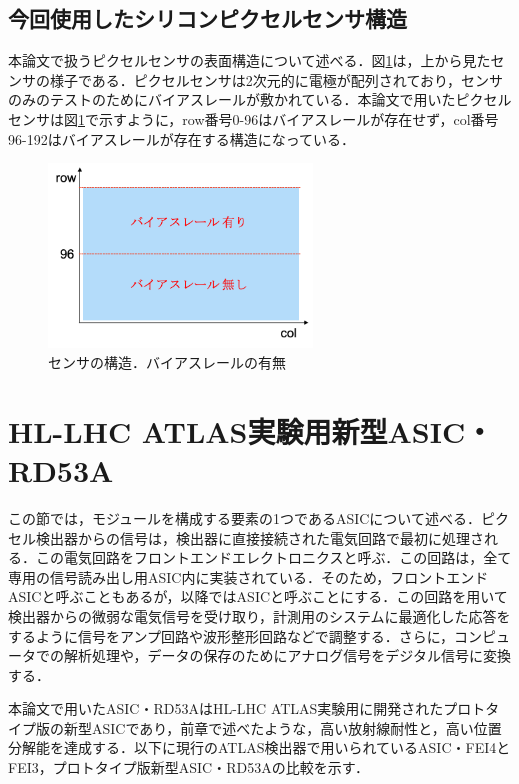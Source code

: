 \subsection{今回使用したシリコンピクセルセンサ構造}
本論文で扱うピクセルセンサの表面構造について述べる．図\ref{fig:sensor}は，上から見たセンサの様子である．ピクセルセンサは2次元的に電極が配列されており，センサのみのテストのためにバイアスレールが敷かれている．本論文で用いたピクセルセンサは図\ref{fig:sensor}で示すように，row番号0-96はバイアスレールが存在せず，col番号96-192はバイアスレールが存在する構造になっている．

\begin{figure}[h]
  \centering
  \includegraphics[width=7cm]{./figure/sensor.png}
  \caption{センサの構造．バイアスレールの有無}
  \label{fig:sensor}
\end{figure}


\section{HL-LHC ATLAS実験用新型ASIC・RD53A}
\label{sec:rd53a}
この節では，モジュールを構成する要素の1つであるASICについて述べる．ピクセル検出器からの信号は，検出器に直接接続された電気回路で最初に処理される．この電気回路をフロントエンドエレクトロニクスと呼ぶ．この回路は，全て専用の信号読み出し用ASIC内に実装されている．そのため，フロントエンドASICと呼ぶこともあるが，以降ではASICと呼ぶことにする．この回路を用いて検出器からの微弱な電気信号を受け取り，計測用のシステムに最適化した応答をするように信号をアンプ回路や波形整形回路などで調整する．さらに，コンピュータでの解析処理や，データの保存のためにアナログ信号をデジタル信号に変換する．\par
本論文で用いたASIC・RD53AはHL-LHC ATLAS実験用に開発されたプロトタイプ版の新型ASICであり，前章で述べたような，高い放射線耐性と，高い位置分解能を達成する．以下に現行のATLAS検出器で用いられているASIC・FEI4とFEI3，プロトタイプ版新型ASIC・RD53Aの比較を示す．


